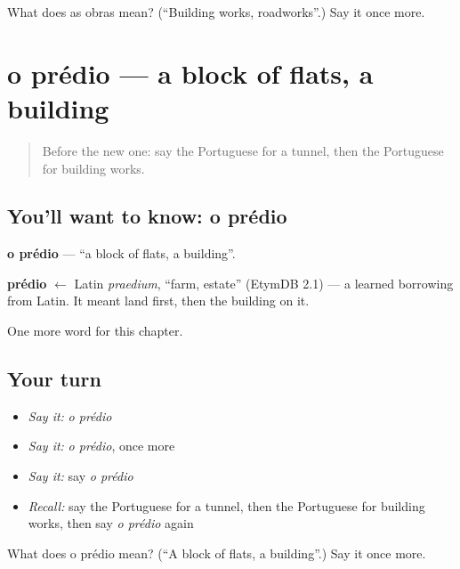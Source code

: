 \begin{tcolorbox}[breakable,colback=teal!4,colframe=teal!35!black,title={Before you move on}]
What does as obras mean? (\textquotedblleft{}Building works, roadworks\textquotedblright{}.) Say it once more.
\end{tcolorbox}
\section[o prédio]{o prédio — a block of flats, a building}

\label{lesson:PT-C163-predio}



\begin{quote}
Before the new one: say the Portuguese for a tunnel, then the Portuguese for building works.
\end{quote}

\subsection*{You'll want to know: o prédio}
\textbf{o prédio} — \textquotedblleft{}a block of flats, a building\textquotedblright{}.

\begin{cousinweb}
\textbf{prédio} $\leftarrow$ Latin \emph{praedium}, \textquotedblleft{}farm, estate\textquotedblright{} (EtymDB 2.1) — a learned borrowing from Latin. It meant land first, then the building on it.
\end{cousinweb}

\begin{grammarlens}[title={What you've built}]
One more word for this chapter.
\end{grammarlens}

\subsection*{Your turn}
\begin{itemize}
\raggedright
  \item \emph{Say it:} \emph{o prédio}
  \item \emph{Say it:} \emph{o prédio}, once more
  \item \emph{Say it:} say \emph{o prédio}
  \item \emph{Recall:} say the Portuguese for a tunnel, then the Portuguese for building works, then say \emph{o prédio} again
\end{itemize}

\begin{tcolorbox}[breakable,colback=teal!4,colframe=teal!35!black,title={Before you move on}]
What does o prédio mean? (\textquotedblleft{}A block of flats, a building\textquotedblright{}.) Say it once more.
\end{tcolorbox}
